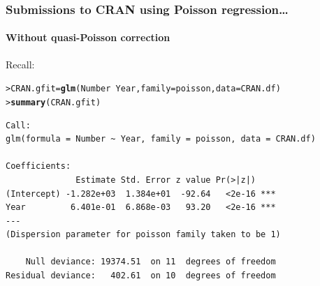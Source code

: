\documentclass{beamer}\usepackage[]{graphicx}\usepackage[]{xcolor}
\makeatletter
\newcommand{\hlopt}[1]{\textcolor[rgb]{0,0,0}{#1}}%
\newcommand{\hlstd}[1]{\textcolor[rgb]{0.345,0.345,0.345}{#1}}%
\newcommand{\hlkwb}[1]{\textcolor[rgb]{0.69,0.353,0.396}{#1}}%
\newcommand{\hlkwc}[1]{\textcolor[rgb]{0.333,0.667,0.333}{#1}}%
\newcommand{\hlkwd}[1]{\textcolor[rgb]{0.737,0.353,0.396}{\textbf{#1}}}%
\newenvironment{kframe}{%
 \def\at@end@of@kframe{}%
 \ifinner\ifhmode%
  \def\at@end@of@kframe{\end{minipage}}%
  \begin{minipage}{\columnwidth}%
 \fi\fi%
 \def\FrameCommand##1{\hskip\@totalleftmargin \hskip-\fboxsep
 \colorbox{shadecolor}{##1}\hskip-\fboxsep
     \hskip-\linewidth \hskip-\@totalleftmargin \hskip\columnwidth}%
 \MakeFramed {\advance\hsize-\width
   \@totalleftmargin\z@ \linewidth\hsize
   \@setminipage}}%
 {\par\unskip\endMakeFramed%
 \at@end@of@kframe}
\newenvironment{knitrout}{}{} %
\makeatother
\begin{document}
\begin{frame}[fragile]
\frametitle{Submissions to CRAN using Poisson regression\ldots}
\framesubtitle{Without quasi-Poisson correction}
Recall:

\begin{knitrout}\scriptsize
{}\color{fgcolor}\begin{kframe}
\begin{alltt}
\hlstd{> }\hlstd{CRAN.gfit}\hlkwb{=} \hlkwd{glm}\hlstd{(Number}\hlopt{~}\hlstd{Year,}\hlkwc{family}\hlstd{=poisson,}\hlkwc{data}\hlstd{=CRAN.df)}
\hlstd{> }\hlkwd{summary}\hlstd{(CRAN.gfit)}
\end{alltt}
\end{kframe}
\end{knitrout}

\begin{knitrout}\scriptsize
{}\color{fgcolor}\begin{kframe}
\begin{verbatim}
Call:
glm(formula = Number ~ Year, family = poisson, data = CRAN.df)

Coefficients:
              Estimate Std. Error z value Pr(>|z|)    
(Intercept) -1.282e+03  1.384e+01  -92.64   <2e-16 ***
Year         6.401e-01  6.868e-03   93.20   <2e-16 ***
---
(Dispersion parameter for poisson family taken to be 1)

    Null deviance: 19374.51  on 11  degrees of freedom
Residual deviance:   402.61  on 10  degrees of freedom
\end{verbatim}
\end{kframe}
\end{knitrout}

\end{frame}
\end{document}
